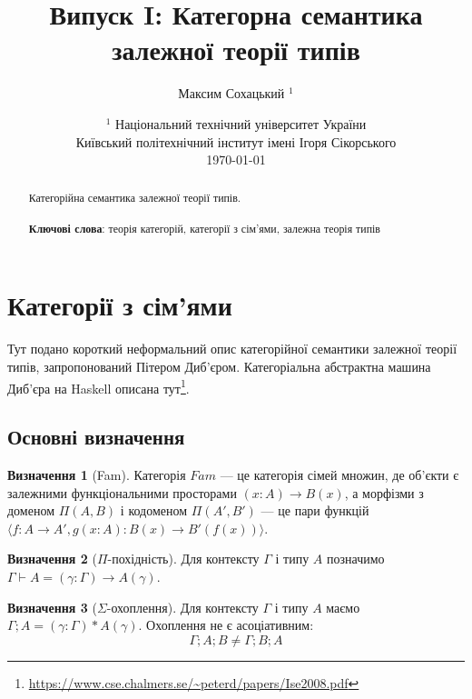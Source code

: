 \documentclass{article}
\theoremstyle{definition}
\newtheorem{definition}{Визначення}[section]
\begin{document}
\title{Випуск I: Категорна семантика \\ залежної теорії типів}
\author{Максим Сохацький $^1$}
\date{ $^1$ Національний технічний університет України \\
       \small Київський політехнічний інститут імені Ігоря Сікорського \\
       \today }

\maketitle

\begin{abstract}

Категорійна семантика залежної теорії типів. \\
\\
{\bf Ключові слова}: теорія категорій, категорії з сім'ями, залежна теорія типів
\end{abstract}
\tableofcontents

\newpage
\section{Категорії з сім'ями}

Тут подано короткий неформальний опис категорійної семантики залежної теорії типів, запропонований Пітером Диб’єром.
Категоріальна абстрактна машина Диб'єра на Haskell описана тут\footnote{\url{https://www.cse.chalmers.se/~peterd/papers/Ise2008.pdf}}.

\subsection{Основні визначення}

\begin{definition}[Fam]
Категорія $Fam$ --- це категорія сімей множин, де об’єкти є залежними функціональними просторами $(x:A)\rightarrow B(x)$, а морфізми з доменом $\Pi(A,B)$ і кодоменом $\Pi(A',B')$ --- це пари функцій $\langle f:A\rightarrow A', g(x:A):B(x)\rightarrow B'(f(x)) \rangle$.
\end{definition}

\begin{definition}[$\Pi$-похідність]
Для контексту $\Gamma$ і типу $A$ позначимо $\Gamma\vdash A = (\gamma:\Gamma)\rightarrow A(\gamma)$.
\end{definition}

\begin{definition}[$\Sigma$-охоплення]
Для контексту $\Gamma$ і типу $A$ маємо $\Gamma;A = (\gamma:\Gamma)*A(\gamma)$. Охоплення не є асоціативним:
\[
    \Gamma;A;B \neq \Gamma;B;A
\]
\end{definition}
\end{document}
